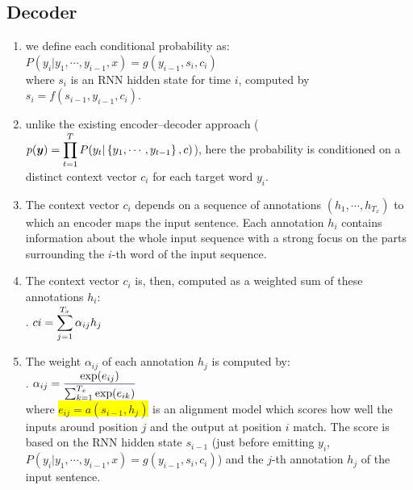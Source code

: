 \subsection{Decoder}

\begin{enumerate}
    \item we define each conditional probability as:
    $ P(y_i|y_1, \cdots , y_{i-1}, x) = g(y_{i-1}, s_i, c_i) $
    \hfill \cite{arxiv/1409.0473/NMT-Jointly-Learning-Align-Translate}
    \\[0.2cm]
    where $s_i$ is an RNN hidden state for time $i$, computed by 
    $s_i = f (s_{i-1}, y_{i-1}, c_i)$.
    \hfill \cite{arxiv/1409.0473/NMT-Jointly-Learning-Align-Translate}

    \item unlike the existing encoder–decoder approach ($p(\bm{y}) = \displaystyle\prod_{t=1}^T P(y_t | \left\{y_1, \cdots , y_{t-1}\right\} , c)$), here the probability is conditioned on a distinct context vector $c_i$ for each target word $y_i$.
    \hfill \cite{arxiv/1409.0473/NMT-Jointly-Learning-Align-Translate}

    \item The context vector $c_i$ depends on a sequence of annotations $(h_1, \cdots , h_{T_x} )$ to which an encoder maps the input sentence. 
    Each annotation $h_i$ contains information about the whole input sequence with a strong focus on the parts surrounding the $i$-th word of the input sequence. 
    \hfill \cite{arxiv/1409.0473/NMT-Jointly-Learning-Align-Translate}

    \item The context vector $c_i$ is, then, computed as a weighted sum of these annotations $h_i$:
    \hfill \cite{arxiv/1409.0473/NMT-Jointly-Learning-Align-Translate}
    \\[0.2cm]
    .\hfill
    $ ci = \displaystyle\sum_{j=1}^{T_x} \alpha_{ij} h_j  $
    \hfill \cite{arxiv/1409.0473/NMT-Jointly-Learning-Align-Translate}

    \item The weight $\alpha_{ij}$ of each annotation $h_j$ is computed by:
    \hfill \cite{arxiv/1409.0473/NMT-Jointly-Learning-Align-Translate}
    \\[0.2cm]
    .\hfill
    $ \alpha_{ij}  =\dfrac{\exp (e_{ij} )}{\textstyle\sum_{k=1}^{T_x} \exp (e_{ik}) } $
    \hfill \cite{arxiv/1409.0473/NMT-Jointly-Learning-Align-Translate}
    \\[0.2cm]
    where \colorbox{yellow}{$e_{ij} = a(s_{i-1}, h_j )$} is an alignment model which scores how well the inputs around position $j$ and the output at position $i$ match. 
    The score is based on the RNN hidden state $s_{i-1}$ (just before emitting $y_i$, $ P(y_i|y_1, \cdots , y_{i-1}, x) = g(y_{i-1}, s_i, c_i) $) and the $j$-th annotation $h_j$ of the input sentence.
    \hfill \cite{arxiv/1409.0473/NMT-Jointly-Learning-Align-Translate}
\end{enumerate}














